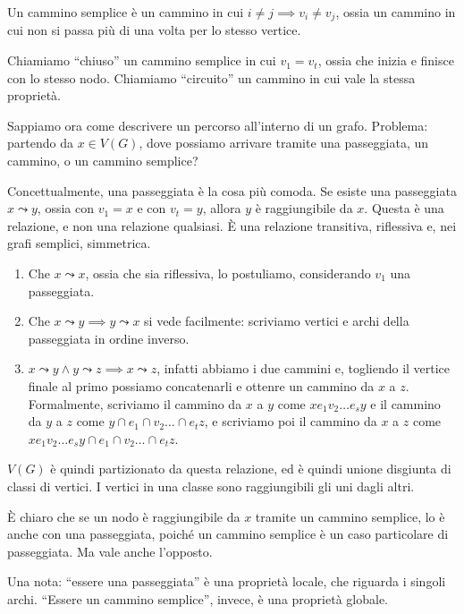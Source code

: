 \begin{defn}
	Un cammino semplice \`e un cammino in cui $i \neq j \implies v_i \neq v_j$, ossia un cammino in cui non si passa pi\`u di una volta per lo stesso vertice.
\end{defn}

Chiamiamo ``chiuso'' un cammino semplice in cui $v_1 = v_t$, ossia che inizia e finisce con lo stesso nodo.
Chiamiamo ``circuito'' un cammino in cui vale la stessa propriet\`a.

Sappiamo ora come descrivere un percorso all'interno di un grafo.
Problema: partendo da $x \in V(G)$, dove possiamo arrivare tramite una passeggiata, un cammino, o un cammino semplice?

Concettualmente, una passeggiata \`e la cosa pi\`u comoda.
Se esiste una passeggiata $x \leadsto y$, ossia con $v_1 = x$ e con $v_t = y$, allora $y$ \`e raggiungibile da $x$.
Questa \`e una relazione, e non una relazione qualsiasi.
\`E una relazione transitiva, riflessiva e, nei grafi semplici, simmetrica.
\begin{enumerate}
	\item Che $x \leadsto x$, ossia che sia riflessiva, lo postuliamo, considerando $v_1$ una passeggiata.
	\item Che $x \leadsto y \implies y \leadsto x$ si vede facilmente: scriviamo vertici e archi della passeggiata in ordine inverso.
	\item $x \leadsto y \land y \leadsto z \implies x \leadsto z$, infatti abbiamo i due cammini e, togliendo il vertice finale al primo possiamo concatenarli e ottenre un cammino da $x$ a $z$.
		Formalmente, scriviamo il cammino da $x$ a $y$ come $x e_1 v_2 \dots e_s y$ e il cammino da $y$ a $z$ come $y \cap{e}_1 \cap{v}_2 \dots \cap{e}_t z$, e scriviamo poi il cammino da $x$ a $z$ come $x e_1 v_2 \dots e_s y \cap{e}_1 \cap{v}_2 \dots \cap{e}_t z$.
\end{enumerate}

$V(G)$ \`e quindi partizionato da questa relazione, ed \`e quindi unione disgiunta di classi di vertici.
I vertici in una classe sono raggiungibili gli uni dagli altri.

\`E chiaro che se un nodo \`e raggiungibile da $x$ tramite un cammino semplice, lo \`e anche con una passeggiata, poich\'e un cammino semplice \`e un caso particolare di passeggiata.
Ma vale anche l'opposto.

Una nota: ``essere una passeggiata'' \`e una propriet\`a locale, che riguarda i singoli archi.
``Essere un cammino semplice'', invece, \`e una propriet\`a globale.

